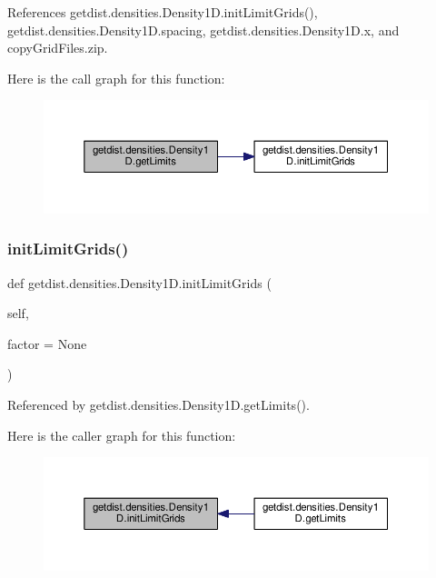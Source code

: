 References getdist.\+densities.\+Density1\+D.\+init\+Limit\+Grids(), getdist.\+densities.\+Density1\+D.\+spacing, getdist.\+densities.\+Density1\+D.\+x, and copy\+Grid\+Files.\+zip.

Here is the call graph for this function\+:
\nopagebreak
\begin{figure}[H]
\begin{center}
\leavevmode
\includegraphics[width=350pt]{classgetdist_1_1densities_1_1Density1D_a047d00eda8fabc15756ab9dae81a729a_cgraph}
\end{center}
\end{figure}
\mbox{\label{classgetdist_1_1densities_1_1Density1D_a13570bf7002783d0e46ec9e607198adc}} 
\subsubsection{\texorpdfstring{init\+Limit\+Grids()}{initLimitGrids()}}
{\footnotesize\ttfamily def getdist.\+densities.\+Density1\+D.\+init\+Limit\+Grids (\begin{DoxyParamCaption}\item[{}]{self,  }\item[{}]{factor = {\ttfamily None} }\end{DoxyParamCaption})}



Referenced by getdist.\+densities.\+Density1\+D.\+get\+Limits().

Here is the caller graph for this function\+:
\nopagebreak
\begin{figure}[H]
\begin{center}
\leavevmode
\includegraphics[width=350pt]{classgetdist_1_1densities_1_1Density1D_a13570bf7002783d0e46ec9e607198adc_icgraph}
\end{center}
\end{figure}
\mbox{\label{classgetdist_1_1densities_1_1Density1D_a6422563b78860b3e11f080eed5b0ccfd}} 

